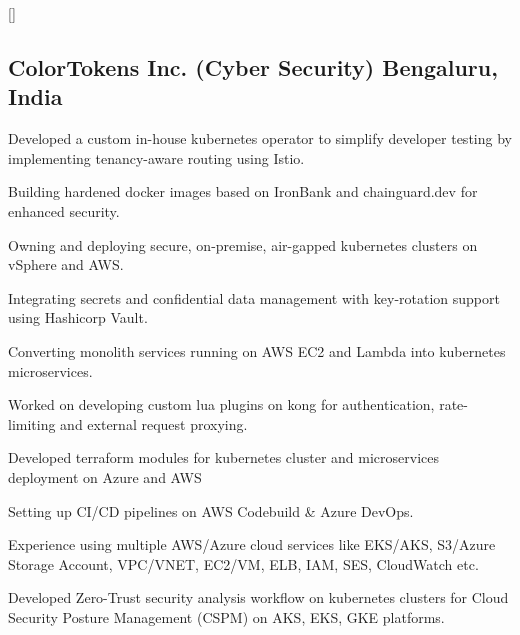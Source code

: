 \titlespacing*{\subsubsection}{0em}{0em}{0em}
\titleformat{\subsubsection}{\itshape}{}{0em}{}[]


\subsection{ColorTokens Inc. (Cyber Security) \hfill Bengaluru, India}
\begin{zitemize}
    \item Developed a custom in-house kubernetes operator to simplify developer testing by implementing tenancy-aware routing using Istio.
    \item Building hardened docker images based on IronBank and chainguard.dev for enhanced security.
    \item Owning and deploying secure, on-premise, air-gapped kubernetes clusters on vSphere and AWS.
    \item Integrating secrets and confidential data management with key-rotation support using Hashicorp Vault.
    \item Converting monolith services running on AWS EC2 and Lambda into kubernetes microservices.
    \item Worked on developing custom lua plugins on kong for authentication, rate-limiting and external request proxying.
    \item Developed terraform modules for kubernetes cluster and microservices deployment on Azure and AWS
    \item Setting up CI/CD pipelines on AWS Codebuild \& Azure DevOps.
    \item Experience using multiple AWS/Azure cloud services like EKS/AKS, S3/Azure Storage Account, VPC/VNET, EC2/VM, ELB, IAM, SES, CloudWatch etc.
    \item Developed Zero-Trust security analysis workflow on kubernetes clusters for Cloud Security Posture Management (CSPM) on AKS, EKS, GKE platforms.
\end{zitemize}


